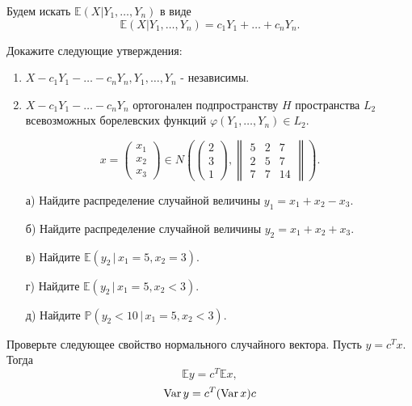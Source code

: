 \begin{ordre}
Будем искать 
${\mathbb E}(X|Y_1,\ldots,Y_n)$ в виде 
\begin{equation}
\label{Gauss}
{\mathbb E}(X|Y_1,\ldots,Y_n)=c_1 Y_1+\ldots +c_n Y_n . 
\end{equation}

Докажите следующие утверждения:

\begin{enumerate}
\item $X-c_1 Y_1-\ldots-c_n Y_n, Y_1,\ldots, Y_n$ - независимы.
\item $X-c_1 Y_1-\ldots-c_n Y_n$ ортогонален подпространству $H$ пространства $L_2$ всевозможных борелевских функций $\varphi(Y_1,\ldots,Y_n)\in L_2$.
\end{enumerate}
 
\end{ordre}



\begin{problem}
$$
x=\begin{pmatrix}
x_1\\
x_2\\
x_3
\end{pmatrix}
\in N\left(
\begin{pmatrix}
2\\
3\\
1
\end{pmatrix}, 
\begin{Vmatrix}
5 & 2 & 7\\
2 & 5 & 7\\
7 & 7 & 14
\end{Vmatrix}
\right) . 
$$
\begin{enumerate}
\item[а)] Найдите распределение случайной величины $y_1=x_1+x_2-x_3$. 
\item[б)] Найдите распределение случайной величины $y_2=x_1+x_2+x_3$. 
\item[в)] Найдите ${\mathbb E}(y_2\, |\, x_1=5, x_2=3)$. 
\item[г)] Найдите ${\mathbb E}(y_2\, |\, x_1=5, x_2<3)$. 
\item[д)] Найдите ${\mathbb P}(y_2<10\, |\, x_1=5, x_2<3)$. 
\end{enumerate}
\end{problem}

\begin{ordre}
Проверьте следующее свойство нормального случайного вектора.
Пусть $y=c^Tx$. Тогда 
$$
{\mathbb E}y=c^T{\mathbb E}x, 
$$
$$
\mathop{\mathrm{Var}}\nolimits y=c^T (\mathop{\mathrm{Var}}\nolimits x) c 
$$
\end{ordre}



